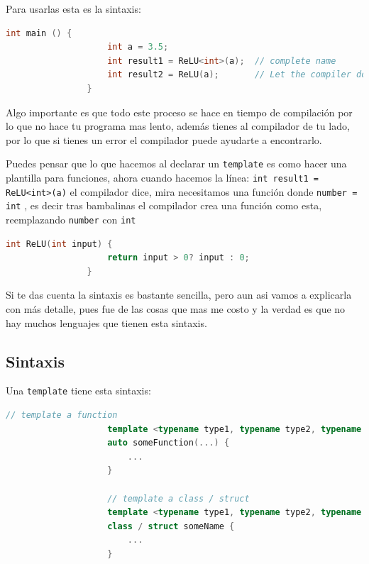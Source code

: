 \documentclass[12pt, fleqn]{report}                             %
\theoremstyle{break}                                            %
\newcommand{\textCode}[1]  { \texttt{#1} }                      %
\begin{document}
            Para usarlas esta es la sintaxis:
            \begin{lstlisting}[language=C++, gobble=16]
                int main () {
                    int a = 3.5;
                    int result1 = ReLU<int>(a);  // complete name
                    int result2 = ReLU(a);       // Let the compiler do the work
                }
            \end{lstlisting}

            Algo importante es que todo este proceso se hace en tiempo de compilación por lo que no hace tu programa
            mas lento, además tienes al compilador de tu lado, por lo que si tienes un error el compilador puede ayudarte
            a encontrarlo.

            Puedes pensar que lo que hacemos al declarar un \textCode{template} es como hacer una plantilla
            para funciones, ahora cuando hacemos la línea: \textCode{int result1 = ReLU<int>(a)}
            el compilador dice, mira necesitamos una función donde \textCode{number = int}, es decir tras bambalinas
            el compilador crea una función como esta, reemplazando \textCode{number} con \textCode{int}
            \begin{lstlisting}[language=C++, gobble=16]
                int ReLU(int input) {
                    return input > 0? input : 0;
                }
            \end{lstlisting}

            Si te das cuenta la sintaxis es bastante sencilla, pero aun asi vamos a explicarla con más detalle, pues
            fue de las cosas que mas me costo y la verdad es que no hay muchos lenguajes que tienen esta sintaxis.

            \subsection{Sintaxis}

                Una \textCode{template} tiene esta sintaxis:
                \begin{lstlisting}[language=C++, gobble=20]
                    // template a function
                    template <typename type1, typename type2, typename type3...>
                    auto someFunction(...) {
                        ...
                    }

                    // template a class / struct
                    template <typename type1, typename type2, typename type3...>
                    class / struct someName {
                        ...
                    }
                \end{lstlisting}
\end{document}
